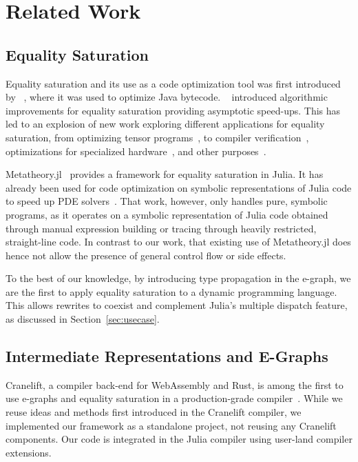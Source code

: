 \section{Related Work}
\label{sec:related work}
\subsection{Equality Saturation}
Equality saturation and its use as a code optimization tool was first introduced by \citeauthor{tateEqualitySaturationNew2009}~\cite{tateEqualitySaturationNew2009}, where it was used to optimize Java bytecode.
\citeauthor{willseyEggFastExtensible2021}~\cite{willseyEggFastExtensible2021} introduced algorithmic improvements for equality saturation providing asymptotic speed-ups.
This has led to an explosion of new work exploring different applications for equality saturation, from optimizing tensor programs~\cite{wangSPORESSumproductOptimization2020,MLSYS2021_cc427d93,smithPureTensorProgram2021}, to compiler verification~\cite{steppEqualityBasedTranslationValidator2011,kourtaCaviarEgraphBased2022}, optimizations for specialized hardware~\cite{ustunIMpressLargeInteger2022,vanhattumVectorizationDigitalSignal2021,matsumuraSymbolicEmulatorShuffle2023}, and other purposes~\cite{panchekhaAutomaticallyImprovingAccuracy2015,chandrakananandiRewriteRuleInference2021}.

Metatheory.jl~\cite{cheliMetatheoryjlFastElegant2021} provides a framework for equality saturation in Julia.
It has already been used for code optimization on symbolic representations of Julia code to speed up PDE solvers~\cite{gowdaHighperformanceSymbolicnumericsMultiple2022}. That work, however, only handles pure, symbolic programs, as it operates on a symbolic representation of Julia code obtained through manual expression building or tracing through heavily restricted, straight-line code. In contrast to our work, that existing use of Metatheory.jl does hence not allow the presence of general control flow or side effects.

To the best of our knowledge, by introducing type propagation in the e-graph, we are the first to apply equality saturation to a dynamic programming language.
This allows rewrites to coexist and complement Julia's multiple dispatch feature, as discussed in Section~\ref{sec:usecase}.

\subsection{Intermediate Representations and E-Graphs}
Cranelift, a compiler back-end for WebAssembly and Rust, is among the first to use e-graphs and equality saturation in a production-grade compiler~\cite{fallinAegraphsAcyclicEgraphs2023}. While we reuse ideas and methods first introduced in the Cranelift compiler, we implemented our framework as a standalone project, not reusing any Cranelift components. Our code is integrated in the Julia compiler using user-land compiler extensions.

